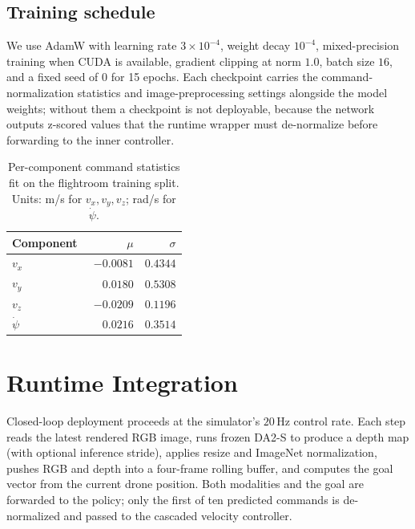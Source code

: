 \documentclass[10pt,twocolumn,letterpaper]{article}
\begin{document}
\subsection{Training schedule}

We use AdamW with learning rate $3\!\times\!10^{-4}$, weight decay $10^{-4}$, mixed-precision training when CUDA is available, gradient clipping at norm $1.0$, batch size $16$, and a fixed seed of $0$ for 15 epochs. Each checkpoint carries the command-normalization statistics and image-preprocessing settings alongside the model weights; without them a checkpoint is not deployable, because the network outputs z-scored values that the runtime wrapper must de-normalize before forwarding to the inner controller.

\begin{table}[t]
\centering
\caption{Per-component command statistics fit on the flightroom training split. Units: m/s for $v_x,v_y,v_z$; rad/s for $\dot{\psi}$.}
\label{tab:stats}
\small
\begin{tabular}{@{}lrr@{}}
\toprule
Component & $\mu$ & $\sigma$ \\
\midrule
$v_x$        & $-0.0081$ & $0.4344$ \\
$v_y$        & $\phantom{-}0.0180$ & $0.5308$ \\
$v_z$        & $-0.0209$ & $0.1196$ \\
$\dot{\psi}$ & $\phantom{-}0.0216$ & $0.3514$ \\
\bottomrule
\end{tabular}
\end{table}

\section{Runtime Integration}
\label{sec:runtime}

Closed-loop deployment proceeds at the simulator's $20\,\mathrm{Hz}$ control rate. Each step reads the latest rendered RGB image, runs frozen DA2-S to produce a depth map (with optional inference stride), applies resize and ImageNet normalization, pushes RGB and depth into a four-frame rolling buffer, and computes the goal vector from the current drone position. Both modalities and the goal are forwarded to the policy; only the first of ten predicted commands is de-normalized and passed to the cascaded velocity controller.
\end{document}
